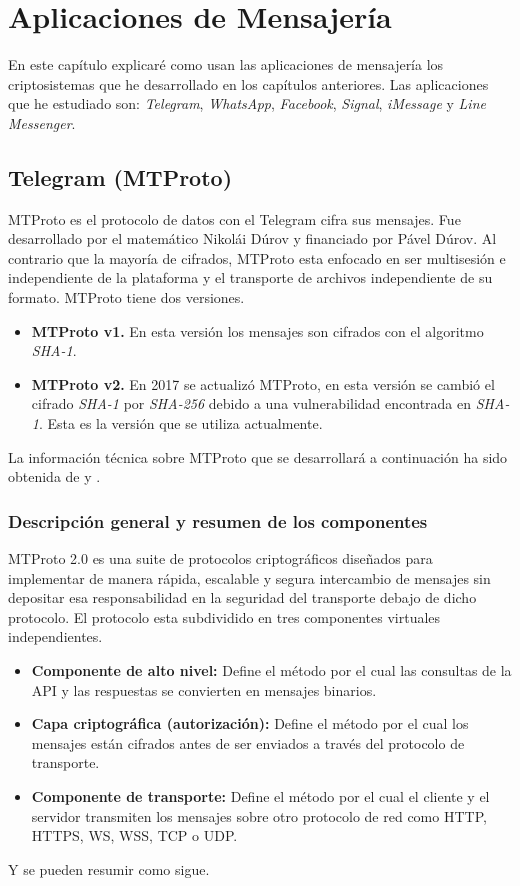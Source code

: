\chapter{Aplicaciones de Mensajería}
En este capítulo explicaré como usan las aplicaciones de mensajería los criptosistemas que he desarrollado en los capítulos anteriores. Las aplicaciones que he estudiado son: \emph{Telegram}, \emph{WhatsApp}, \emph{Facebook}, \emph{Signal}, \emph{iMessage} y \emph{Line Messenger}.

\section{Telegram (MTProto)}
MTProto es el protocolo de datos con el Telegram cifra sus mensajes. Fue desarrollado por el matemático Nikolái Dúrov y financiado por Pável Dúrov. Al contrario que la mayoría de cifrados, MTProto esta enfocado en ser multisesión e independiente de la plataforma y el transporte de archivos independiente de su formato. MTProto tiene dos versiones.
\begin{itemize}
	\item \textbf{MTProto v1.} En esta versión los mensajes son cifrados con el algoritmo \emph{SHA-1}.
	\item \textbf{MTProto v2.} En 2017 se actualizó MTProto, en esta versión se cambió el cifrado \emph{SHA-1} por \emph{SHA-256} debido a una vulnerabilidad encontrada en \emph{SHA-1}. Esta es la versión que se utiliza actualmente. 
\end{itemize}
La información técnica sobre MTProto que se desarrollará a continuación ha sido obtenida de \cite{Miculan2021} y \cite{WebProto}.

\subsection{Descripción general y resumen de los componentes}
MTProto 2.0 es una suite de protocolos criptográficos diseñados para implementar de manera rápida, escalable y segura intercambio de mensajes sin depositar esa responsabilidad en la seguridad del transporte debajo de dicho protocolo.
El protocolo esta subdividido en tres componentes virtuales independientes.
\begin{itemize}
	\item \textbf{Componente de alto nivel:} Define el método por el cual las consultas de la API y las respuestas se convierten en mensajes binarios. 
	\item \textbf{Capa criptográfica (autorización):} Define el método por el cual los mensajes están cifrados antes de ser enviados a través del protocolo de transporte.
	\item \textbf{Componente de transporte:} Define el método por el cual el cliente y el servidor transmiten los mensajes sobre otro protocolo de red como HTTP, HTTPS, WS, WSS, TCP o UDP.
\end{itemize}
Y se pueden resumir como sigue.\\

